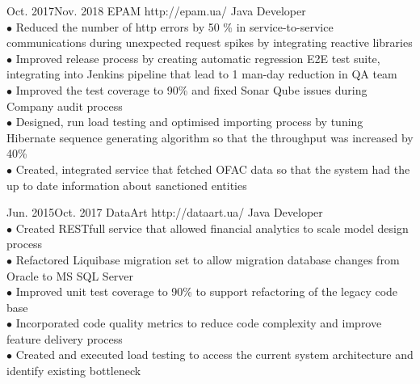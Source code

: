 \documentclass[10pt]{article} %
\begin{document}
\job
{Oct. 2017}{Nov. 2018}
{EPAM}
{http://epam.ua/}
{Java Developer}
{
\textbf{}    
\\$\bullet$ Reduced the number of http errors by 50 \% in service-to-service communications during unexpected request spikes by integrating reactive libraries 
\\$\bullet$ Improved release process by creating automatic regression E2E test suite, integrating into Jenkins pipeline that lead to 1 man-day reduction in QA team 
\\$\bullet$ Improved the test coverage to 90\% and fixed Sonar Qube issues during Company audit process
\\$\bullet$ Designed, run load testing and optimised importing process by tuning Hibernate sequence generating algorithm so that the throughput was increased by 40\%
\\$\bullet$ Created, integrated service that fetched OFAC data so that the system had the up to date information about sanctioned entities
 }

\job
{Jun. 2015}{Oct. 2017}
{DataArt}
{http://dataart.ua/}
{Java Developer}
{
\textbf{}  
\\$\bullet$ Created RESTfull service that allowed financial analytics to scale model design process 
\\$\bullet$ Refactored Liquibase migration set to allow migration database changes from Oracle to MS SQL Server
\\$\bullet$ Improved unit test coverage to 90\% to support refactoring of the legacy code base
\\$\bullet$ Incorporated code quality metrics to reduce code complexity and improve feature delivery process
\\$\bullet$ Created and executed load testing to access the current system architecture and identify existing bottleneck 
 }
\end{document}
